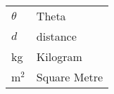 \begin{symbols}
    \noindent
    \begin{tabular*}{\textwidth}{@{}p{}p{}@{}}
        {$\theta$} & {Theta} \\
        {$d$} & {distance} \\
        {kg} & {Kilogram} \\
        {m$^{2}$} & {Square Metre} \\
    \end{tabular*}
\end{symbols}